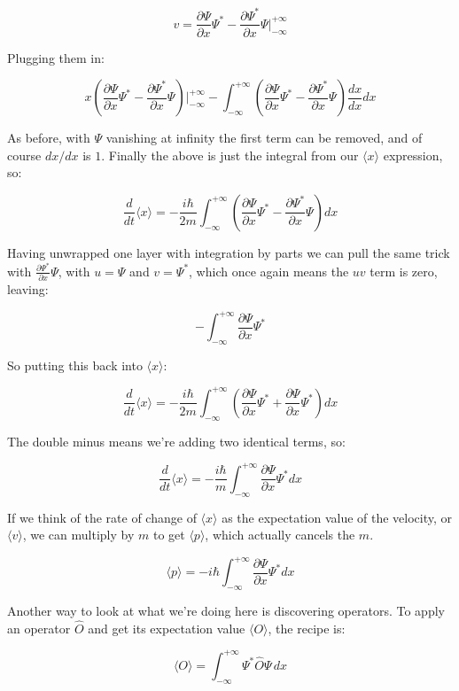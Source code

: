 $$
v =
\frac{\partial \Psi}{\partial x}\Psi^*
- \frac{\partial \Psi^*}{\partial x}\Psi
\bigg\rvert_{-\infty}^{+\infty}
$$

Plugging them in:

$$
x
\left(
\frac{\partial \Psi}{\partial x}\Psi^*
- \frac{\partial \Psi^*}{\partial x}\Psi
\right)
\bigg\rvert_{-\infty}^{+\infty}
-
\int_{-\infty}^{+\infty}
\left(
\frac{\partial \Psi}{\partial x}\Psi^*
- \frac{\partial \Psi^*}{\partial x}\Psi
\right)
\frac{dx}{dx}
dx
$$

As before, with $\Psi$ vanishing at infinity the first term can be removed, and of course $dx/dx$ is $1$. Finally the above is just the integral from our $\langle x \rangle$ expression, so:

$$
\frac{d}{dt} \langle x \rangle = -
\frac{i \hbar}{2m}
\int_{-\infty}^{+\infty}
\left(
\frac{\partial \Psi}{\partial x}\Psi^*
- \frac{\partial \Psi^*}{\partial x}\Psi
\right)
dx
$$

Having unwrapped one layer with integration by parts we can pull the same trick with $\frac{\partial \Psi^*}{\partial x}\Psi$, with $u = \Psi$ and $v = \Psi^*$, which once again means the $uv$ term is zero, leaving:

$$
-
\int_{-\infty}^{+\infty}
\frac{\partial \Psi}{\partial x}
\Psi^*
$$

So putting this back into $\langle x \rangle$:

$$
\frac{d}{dt} \langle x \rangle = -
\frac{i \hbar}{2m}
\int_{-\infty}^{+\infty}
\left(
\frac{\partial \Psi}{\partial x}\Psi^*
+ \frac{\partial \Psi}{\partial x}\Psi^*
\right)
dx
$$

The double minus means we're adding two identical terms, so:

$$
\frac{d}{dt} \langle x \rangle = -
\frac{i \hbar}{m}
\int_{-\infty}^{+\infty}
\frac{\partial \Psi}{\partial x}\Psi^*
dx
$$

If we think of the rate of change of $\langle x \rangle$ as the expectation value of the velocity, or $\langle v \rangle$, we can multiply by $m$ to get $\langle p \rangle$, which actually cancels the $m$.

$$
\langle p \rangle = -
i \hbar
\int_{-\infty}^{+\infty}
\frac{\partial \Psi}{\partial x}\Psi^*
dx
$$

Another way to look at what we're doing here is discovering operators. To apply an operator $\hat{O}$ and get its expectation value $\langle O \rangle$, the recipe is:

$$
\langle O \rangle =
\int_{-\infty}^{+\infty}
\Psi^*
\hat{O}
\Psi
\,dx
$$

